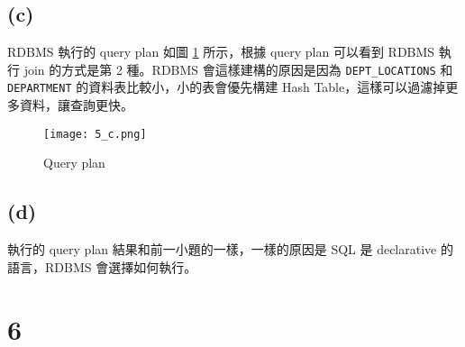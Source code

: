\documentclass{article}
\begin{document}
\subsection*{(c)}
RDBMS 執行的 query plan 如圖 \ref{fig:5_c} 所示，根據 query plan 可以看到 RDBMS 執行 join 的方式是第 2 種。RDBMS 會這樣建構的原因是因為 \texttt{DEPT\_LOCATIONS} 和 \texttt{DEPARTMENT} 的資料表比較小，小的表會優先構建 Hash Table，這樣可以過濾掉更多資料，讓查詢更快。
\begin{figure}[H]
    \centering
    \texttt{[image: 5\_c.png]}
    \caption{Query plan}
    \label{fig:5_c}
\end{figure}


\subsection*{(d)}
執行的 query plan 結果和前一小題的一樣，一樣的原因是 SQL 是 declarative 的語言，RDBMS 會選擇如何執行。

\section*{6}
\end{document}
